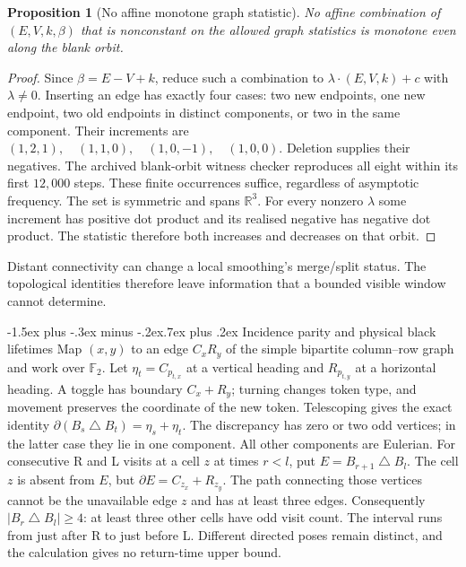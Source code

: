 \documentclass[11pt,letterpaper]{article}
\makeatletter
\renewcommand\subsection{\@startsection{subsection}{2}{\z@}%
  {-1.5ex plus -.3ex minus -.2ex}{.7ex plus .2ex}%
  {\normalfont\large\bfseries}}
\newtheorem{proposition}[theorem]{Proposition}
\newcommand{\F}{\mathbb F}
\makeatother
\begin{document}
\begin{proposition}[No affine monotone graph statistic]
No affine combination of $(E,V,k,\beta)$ that is nonconstant on the
allowed graph statistics is monotone even along the blank orbit.
\end{proposition}
\begin{proof}
Since $\beta=E-V+k$, reduce such a combination to
$\lambda\cdot(E,V,k)+c$ with $\lambda\ne0$.
Inserting an edge has exactly four cases: two new endpoints, one new
endpoint, two old endpoints in distinct components, or two in the same
component. Their increments are
$(1,2,1),\quad(1,1,0),\quad(1,0,-1),\quad(1,0,0)$.
Deletion supplies their negatives. The archived blank-orbit witness
checker reproduces all eight within its first $12{,}000$ steps.
These finite occurrences suffice, regardless of asymptotic frequency.
The set is symmetric and spans $\mathbb R^3$. For every nonzero
$\lambda$ some increment has positive dot product and its realised
negative has negative dot product. The statistic therefore both
increases and decreases on that orbit.
\end{proof}
Distant connectivity can change a local smoothing's merge/split status.
The topological identities therefore leave information that a bounded
visible window cannot determine.

\subsection{Incidence parity and physical black lifetimes}
Map $(x,y)$ to an edge $C_xR_y$ of the simple bipartite column--row
graph and work over $\F_2$. Let $\eta_t=C_{p_{t,x}}$ at a vertical
heading and $R_{p_{t,y}}$ at a horizontal heading. A toggle has
boundary $C_x+R_y$; turning changes token type, and movement preserves
the coordinate of the new token. Telescoping gives the exact identity
$\partial(B_s\mathbin\triangle B_t)=\eta_s+\eta_t$.
The discrepancy has zero or two odd vertices; in the latter case they
lie in one component. All other components are Eulerian.
For consecutive R and L visits at a cell $z$ at times $r<l$, put
$E=B_{r+1}\mathbin\triangle B_l$. The cell $z$ is absent from $E$,
but $\partial E=C_{z_x}+R_{z_y}$. The path connecting those vertices
cannot be the unavailable edge $z$ and has at least three edges.
Consequently $|B_r\mathbin\triangle B_l|\ge4$: at least three
other cells have odd visit count. The interval runs from just after R to just before L. Different directed
poses remain distinct, and the calculation gives no return-time upper bound.
\end{document}
